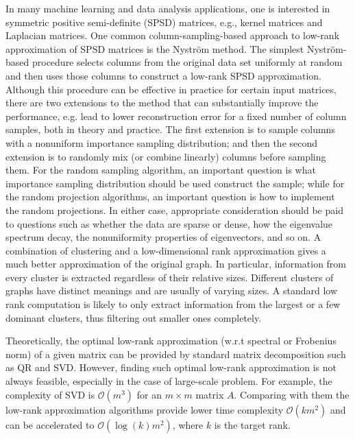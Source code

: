 \documentclass[12pt,letterpaper]{article}
\begin{document}
In many machine learning and data analysis applications, one is interested in symmetric positive semi-definite (SPSD) matrices, e.g., kernel matrices and Laplacian matrices. One common column-sampling-based approach to low-rank approximation of SPSD matrices is the Nystr\"{o}m method. The simplest Nystr\"{o}m-based procedure selects columns from the original data set uniformly at random and then uses those columns to construct a low-rank SPSD approximation.  Although this procedure can be effective in practice for certain input matrices, there are two extensions to the method that can substantially improve the performance, e.g. lead to lower reconstruction error for a fixed number of column samples, both in theory and practice.  The first extension is to sample columns with a nonuniform importance sampling distribution; and then the second extension is to randomly mix (or combine linearly) columns before sampling them. For the random sampling algorithm, an important question is what importance sampling distribution should be used construct the sample; while for the random projection algorithms, an important question is how to implement the random projections. In either case, appropriate consideration should be paid to questions such as whether the data are sparse or dense, how the eigenvalue spectrum decay, the nonuniformity properties of eigenvectors, and so on.  
A combination of clustering and a low-dimensional rank approximation gives a much better approximation of the original graph. In particular, information from every cluster is extracted regardless of their relative sizes.  Different clusters of graphs have distinct meanings and are usually of varying sizes. A standard low rank computation is likely to only extract information from the largest or a few dominant clusters, thus filtering out smaller ones completely. 

Theoretically, the optimal low-rank approximation (w.r.t spectral or Frobenius norm) of a given matrix can be provided by standard matrix decomposition such as QR and SVD. However, finding such optimal low-rank approximation is not always feasible, especially in the case of large-scale problem.  For example, the complexity of SVD is $\mathcal{O}(m^3)$ for an $m\times m$ matrix $A$. Comparing with them the low-rank approximation algorithms provide lower time complexity $\mathcal{O}(km^2)$ and can be accelerated to $\mathcal{O}(\log (k)m^2)$, where $k$ is the target rank. 
\end{document}

